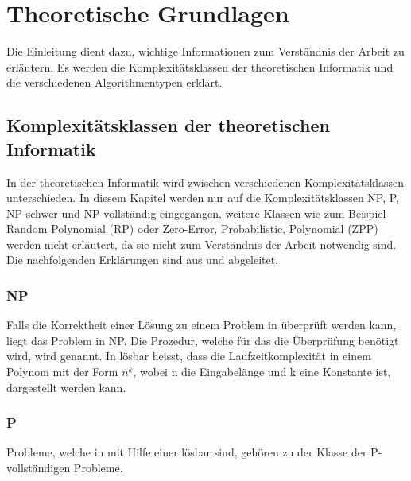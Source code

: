 %
%

\chapter{Theoretische Grundlagen}\label{chap.einleitung}
Die Einleitung dient dazu, wichtige Informationen zum Verständnis der Arbeit zu erläutern. Es werden die Komplexitätsklassen der theoretischen Informatik und die verschiedenen 
Algorithmentypen erklärt.

\section{Komplexitätsklassen der theoretischen Informatik}\label{cat_theo_inf}
In der theoretischen Informatik wird zwischen verschiedenen Komplexitätsklassen unterschieden. In diesem Kapitel werden nur auf die Komplexitätsklassen NP, P, NP-schwer und 
NP-vollständig eingegangen, weitere Klassen wie zum Beispiel Random Polynomial (RP) oder Zero-Error, Probabilistic, Polynomial (ZPP) werden nicht erläutert, da sie nicht zum Verständnis der 
Arbeit notwendig sind. Die nachfolgenden Erklärungen sind aus \cite{hopcroft2011einfuehrung} und \cite{slides_p_np} abgeleitet.

\subsection{NP}\label{np}
Falls die Korrektheit einer Lösung zu einem Problem in  überprüft werden kann, liegt das Problem in NP. Die Prozedur, welche für das die Überprüfung benötigt wird, 
wird  genannt.  In  lösbar heisst, dass die Laufzeitkomplexität in einem Polynom mit der Form $n^k$, wobei n die Eingabelänge 
und k eine Konstante ist, dargestellt werden kann.

\subsection{P}\label{p_complet}
Probleme, welche in  mit Hilfe einer  lösbar sind, gehören zu der Klasse der P-vollständigen Probleme.

